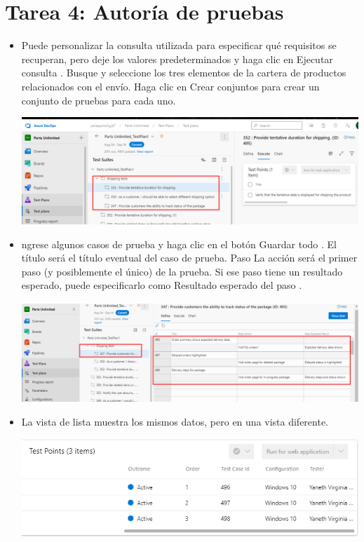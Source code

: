 \section {Tarea 4: Autoría de pruebas } 

\begin{itemize}

\item Puede personalizar la consulta utilizada para especificar qué requisitos se recuperan, pero deje los valores predeterminados y haga clic en Ejecutar consulta . Busque y seleccione los tres elementos de la cartera de productos relacionados con el envío. Haga clic en Crear conjuntos para crear un conjunto de pruebas para cada uno.


\begin{center}
\includegraphics[width=\columnwidth]{images/16}\newline
\end{center} 
\item ngrese algunos casos de prueba y haga clic en el botón Guardar todo . El título será el título eventual del caso de prueba. Paso La acción será el primer paso (y posiblemente el único) de la prueba. Si ese paso tiene un resultado esperado, puede especificarlo como Resultado esperado del paso .
\begin{center}
\includegraphics[width=\columnwidth]{images/17}\newline
\end{center}
\item La vista de lista muestra los mismos datos, pero en una vista diferente.
\begin{center}
\includegraphics[width=\columnwidth]{images/19}\newline

\end{center}
\end{itemize}
